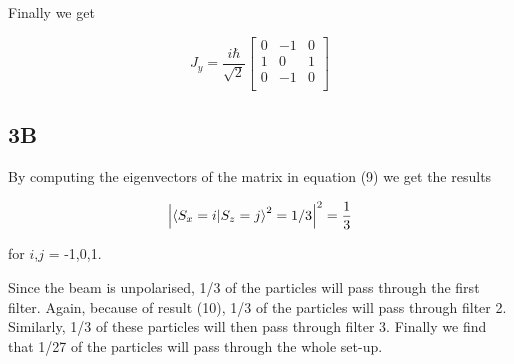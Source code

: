 Finally we get

\begin{equation}
    J_y = 
    \frac{i \hbar}{\sqrt{2}}
    \begin{bmatrix}
    0 & -1 & 0 \\
    1 & 0 & 1 \\
    0 & -1 & 0 \\
    \end{bmatrix}
\end{equation}

\subsection*{3B}

By computing the eigenvectors of the matrix in equation (9) we get the results

\begin{equation}
    \abs{\braket{S_x = i}{S_z = j}^2 = 1/3}^2 = \frac{1}{3}
\end{equation}

for $i$,$j$ = -1,0,1.

Since the beam is unpolarised, 1/3 of the particles will pass through the first filter. Again, because of result (10), 1/3 of the particles will pass through filter 2. Similarly, 1/3 of these particles will then pass through filter 3. Finally we find that 1/27 of the particles will pass through the whole set-up. 

